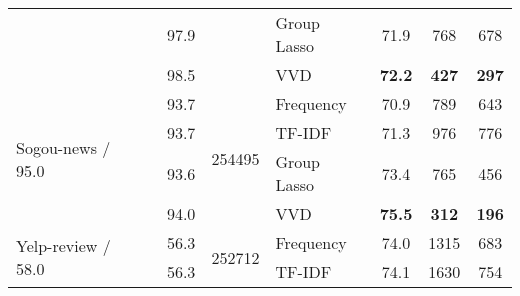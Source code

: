 \begin{table*}[thb]
\begin{tabular}{lcclccc}
                             & 97.9       &                        & Group Lasso         &     71.9   &     768        &    678        \\
                             & 98.5       &               & VVD & \textbf{72.2}  & \textbf{427}   & \textbf{297}   \\ 
\midrule
\multirow{4}{*}{Sogou-news / 95.0~\cite{zhang2015character}}  & 93.7       & \multirow{4}{*}{254495}  & Frequency     & 70.9  & 789 & 643 \\
                             & 93.7       &                        & TF-IDF           & 71.3    & 976  &  776      \\
                             & 93.6       &                        & Group Lasso      & 73.4  &  765 &  456 \\
                             & 94.0       &                        & VVD & \textbf{75.5}  & \textbf{312}   & \textbf{196}   \\ 
\midrule
\multirow{4}{*}{Yelp-review / 58.0~\cite{zhang2015character}} & 56.3       &    \multirow{4}{*}{252712} & Frequency           &  74.0        &      1315      &     683        \\
                             & 56.3       &                        & TF-IDF           &     74.1      &     1630       &    754       \\


\end{tabular}
\end{table*}

